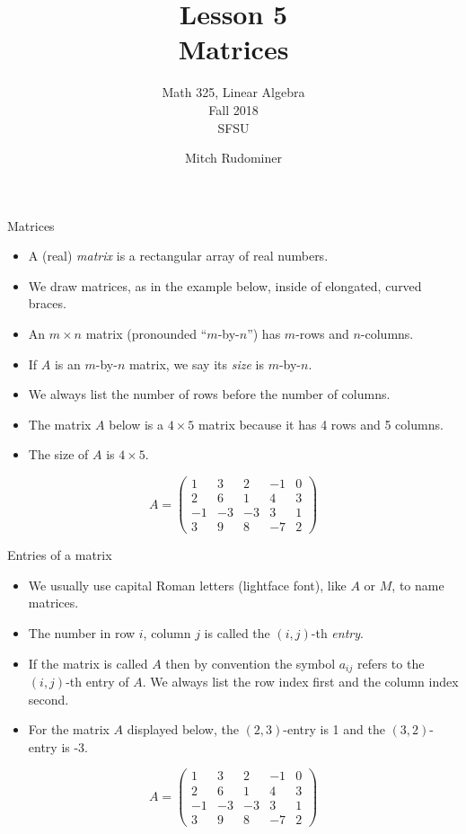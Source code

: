 \documentclass{beamer}
\title{Lesson 5 \\ Matrices}
\subtitle{Math 325, Linear Algebra \\ Fall 2018 \\ SFSU}
\author{Mitch Rudominer}
\date{}
\begin{document}
\begin{frame}
  \titlepage
\end{frame}



\begin{frame}{Matrices}

\begin{itemize}
\item A (real) \emph{matrix} is a rectangular array of real numbers.
\item We draw matrices, as in the example below, inside of elongated, curved
braces.
\item An $m\times n$ matrix (pronounded ``$m$-by-$n$'') has $m$-rows and $n$-columns.
\item If $A$ is an $m$-by-$n$ matrix, we say its \emph{size} is $m$-by-$n$.
\item We always list the number of rows before the number of columns.
\item The matrix $A$ below is a $4\times 5$ matrix because it has 4 rows
and 5 columns.
\item The size of $A$ is $4\times 5$.
\end{itemize}

$$
A =
\begin{pmatrix}
1 & 3 & 2 & -1 & 0 \\
2 & 6 & 1 & 4 & 3\\
-1 & -3 & -3 & 3 & 1 \\
3 & 9 & 8 & -7 & 2
\end{pmatrix}
$$

\end{frame}


\begin{frame}{Entries of a matrix}

\begin{itemize}
\item We usually use capital Roman letters (lightface font), like $A$ or $M$, to name matrices.
\item The number in row $i$, column $j$ is called the $(i,j)$-th \emph{entry}.
\item If the matrix is called $A$ then by convention the symbol $a_{ij}$ refers
to the $(i,j)$-th entry of $A$.
We always list the row index first and the column index second.
\item For the matrix $A$ displayed below, the $(2,3)$-entry is 1 and the
$(3,2)$-entry is -3.
\end{itemize}

$$
A =
\begin{pmatrix}
1 & 3 & 2 & -1 & 0 \\
2 & 6 & 1 & 4 & 3\\
-1 & -3 & -3 & 3 & 1 \\
3 & 9 & 8 & -7 & 2
\end{pmatrix}
$$

\end{frame}
\end{document}
